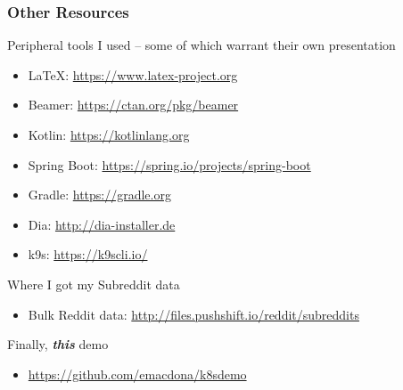     \begin{frame}
        \frametitle{Other Resources}
        Peripheral tools I used -- some of which warrant their own presentation
        \begin{itemize}
            \item \LaTeX: \href{https://www.latex-project.org}{https://www.latex-project.org}
            \item Beamer: \href{https://ctan.org/pkg/beamer}{https://ctan.org/pkg/beamer}
            \item Kotlin: \href{https://kotlinlang.org}{https://kotlinlang.org}
            \item Spring Boot: \href{https://spring.io/projects/spring-boot}{https://spring.io/projects/spring-boot}
            \item Gradle: \href{https://gradle.org}{https://gradle.org}
            \item Dia: \href{http://dia-installer.de}{http://dia-installer.de}
            \item k9s: \href{https://k9scli.io/}{https://k9scli.io/}
        \end{itemize}
        \smallskip
        Where I got my Subreddit data
        \begin{itemize}
            \item Bulk Reddit data: \href{http://files.pushshift.io/reddit/subreddits}{http://files.pushshift.io/reddit/subreddits}
        \end{itemize}
        Finally, \textbf{\textit{this}} demo
        \begin{itemize}
            \item \href{https://github.com/emacdona/k8sdemo}{https://github.com/emacdona/k8sdemo}
        \end{itemize}
    \end{frame}

